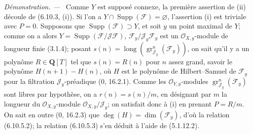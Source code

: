 \documentclass[10pt,oneside]{book}
\newcommand{\oldpage}[2][]{%
  \setcounter{footnote}{0}%
  \marginpar{\scriptsize\textbf{#1}~|~#2}\ignorespaces}
\newenvironment{proof}{%
  \par\medskip\noindent\textit{Démonstration. ---\ }}{\par}
\begin{document}
\begin{proof}
Comme $Y$ est supposé connexe, la première assertion de (ii) découle de
(6.10.3, (i)). Si l'on a
$Y\cap\operatorname{Supp}(\mathcal F)=\varnothing$, l'assertion (i) est
triviale avec $P=0$. Supposons que
$\operatorname{Supp}(\mathcal F)\supset Y$, et soit $y$ un point maximal de
$Y$; comme on a alors $Y=\operatorname{Supp}(\mathcal F/\mathcal J\mathcal F)$,
$\mathcal F_y/\mathcal J_y\mathcal F_y$ est un
$\mathcal O_{X,y}$-module de longueur finie (3.1.4); posant
$s(n)=\operatorname{long}(\operatorname{gr}_{\mathcal J_y}^{n}(\mathcal F_y))$,
on sait qu'il y a un polynôme $R\in\mathbf Q[T]$ tel que $s(n)=R(n)$ pour
$n$ assez grand, savoir le polynôme $H(n+1)-H(n)$, où $H$ est le polynôme
de Hilbert--Samuel de $\mathcal F_y$ pour la filtration
$\mathcal J_y$-préadique (0, 16.2.1). Comme les
$\mathcal O_{Y,y}$-modules
$\operatorname{gr}_{\mathcal J_y}^{n}(\mathcal F_y)$ sont libres par
hypothèse, on a $r(n)=s(n)/m$, en désignant par $m$ la longueur du
$\mathcal O_{X,y}$-module $\mathcal O_{X,y}/\mathcal J_y$; on satisfait donc
à (i) en
prenant $P=R/m$. On sait en outre (0, 16.2.3) que
$\deg(H)=\dim(\mathcal F_y)$, d'où la relation (6.10.5.2); la relation
(6.10.5.3) s'en déduit à l'aide de (5.1.12.2).

\oldpage[IV-2]{157}


\end{proof}
\end{document}
